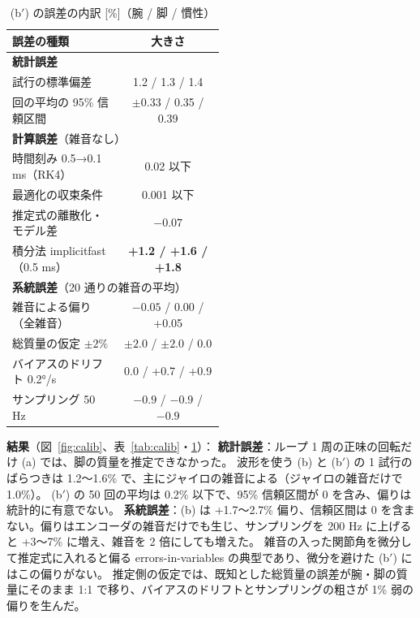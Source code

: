 \documentclass[paper=a4paper,fontsize=10pt,twocolumn,column_gap=2zw,line_length=24zw,number_of_lines=46,head_space=20mm]{jlreq}
\begin{document}
\begin{table}[t]\centering\small
\caption{(b$'$) の誤差の内訳 [\%]（腕 / 脚 / 慣性）}\label{tab:budget}
\setlength{\tabcolsep}{3pt}
\begin{tabular}{p{0.52\linewidth}c}\toprule
誤差の種類 & 大きさ \\\midrule
\multicolumn{2}{l}{\textbf{統計誤差}} \\
\quad 1 試行の標準偏差 & 1.2 / 1.3 / 1.4 \\
\quad 50 回の平均の 95\% 信頼区間 & $\pm$0.33 / 0.35 / 0.39 \\
\multicolumn{2}{l}{\textbf{計算誤差}（雑音なし）} \\
\quad 時間刻み 0.5→0.1 ms（RK4） & 0.02 以下 \\
\quad 最適化の収束条件 & 0.001 以下 \\
\quad 推定式の離散化・モデル差 & $-0.07$ \\
\quad 積分法 implicitfast（0.5 ms） & \textbf{+1.2 / +1.6 / +1.8} \\
\multicolumn{2}{l}{\textbf{系統誤差}（20 通りの雑音の平均）} \\
\quad 雑音による偏り（全雑音） & $-0.05$ / 0.00 / +0.05 \\
\quad 総質量の仮定 $\pm2\%$ & $\pm2.0$ / $\pm2.0$ / 0.0 \\
\quad バイアスのドリフト 0.2°/s & 0.0 / +0.7 / +0.9 \\
\quad サンプリング 50 Hz & $-0.9$ / $-0.9$ / $-0.9$ \\\bottomrule
\end{tabular}
\end{table}

\textbf{結果}（図~\ref{fig:calib}、表~\ref{tab:calib}・\ref{tab:budget}）：
\textbf{統計誤差}：ループ 1 周の正味の回転だけ (a) では、脚の質量を推定できなかった。
波形を使う (b) と (b$'$) の 1 試行のばらつきは 1.2〜1.6\% で、主にジャイロの雑音による（ジャイロの雑音だけで 1.0\%）。
(b$'$) の 50 回の平均は 0.2\% 以下で、95\% 信頼区間が 0 を含み、偏りは統計的に有意でない。
\textbf{系統誤差}：(b) は +1.7〜2.7\% 偏り、信頼区間は 0 を含まない。偏りはエンコーダの雑音だけでも生じ、サンプリングを 200 Hz に上げると +3〜7\% に増え、雑音を 2 倍にしても増えた。
雑音の入った関節角を微分して推定式に入れると偏る errors-in-variables の典型であり、微分を避けた (b$'$) にはこの偏りがない。
推定側の仮定では、既知とした総質量の誤差が腕・脚の質量にそのまま 1:1 で移り、バイアスのドリフトとサンプリングの粗さが 1\% 弱の偏りを生んだ。
\end{document}
